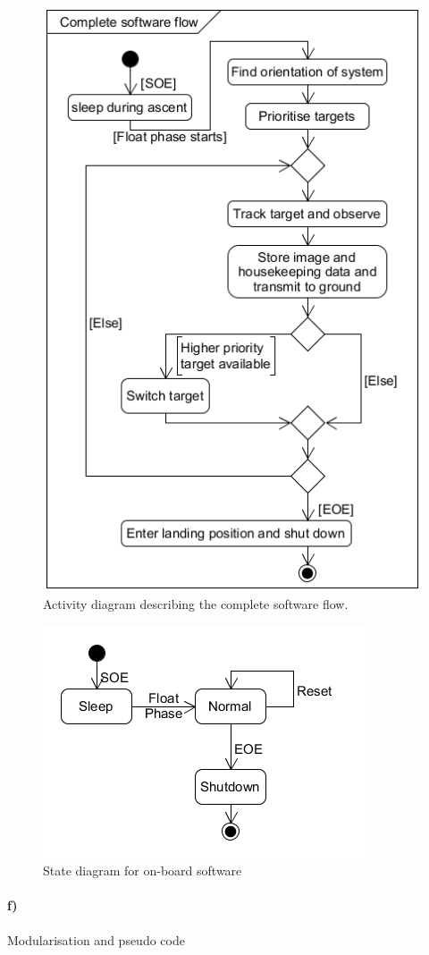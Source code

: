 \begin{figure}[H]
    \centering
    \includegraphics[width=.5\textwidth]{4-experiment-design/img/software/activity-diagram.png}
    \caption{Activity diagram describing the complete software flow.}
    \label{fig:software-activity-diagram}
\end{figure}

\begin{figure}[H]
	\centering
	\includegraphics[width=.6\textwidth]{4-experiment-design/img/software/state-diagram.png}
	\caption{State diagram for on-board software}
	\label{fig:software-state-diagram}
\end{figure}

\paragraph{f)} Modularisation and pseudo code\\

